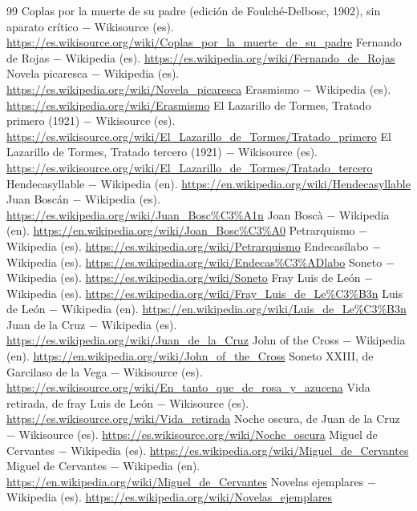 \documentclass{book}
\begin{document}
\begin{thebibliography}{99}
 Coplas por la muerte de su padre (edición de Foulché-Delbosc, 1902), sin aparato crítico \(-\) Wikisource (es). \url{https://es.wikisource.org/wiki/Coplas_por_la_muerte_de_su_padre}
 Fernando de Rojas \(-\) Wikipedia (es). \url{https://es.wikipedia.org/wiki/Fernando_de_Rojas}
 Novela picaresca \(-\) Wikipedia (es). \url{https://es.wikipedia.org/wiki/Novela_picaresca}
 Erasmismo \(-\) Wikipedia (es). \url{https://es.wikipedia.org/wiki/Erasmismo}
 El Lazarillo de Tormes, Tratado primero (1921) \(-\) Wikisource (es). \url{https://es.wikisource.org/wiki/El_Lazarillo_de_Tormes/Tratado_primero}
 El Lazarillo de Tormes, Tratado tercero (1921) \(-\) Wikisource (es). \url{https://es.wikisource.org/wiki/El_Lazarillo_de_Tormes/Tratado_tercero}
 Hendecasyllable \(-\) Wikipedia (en). \url{https://en.wikipedia.org/wiki/Hendecasyllable}
 Juan Boscán \(-\) Wikipedia (es). \url{https://es.wikipedia.org/wiki/Juan_Bosc%C3%A1n}
 Joan Boscà \(-\) Wikipedia (en). \url{https://en.wikipedia.org/wiki/Joan_Bosc%C3%A0}
 Petrarquismo \(-\) Wikipedia (es). \url{https://es.wikipedia.org/wiki/Petrarquismo}
 Endecasílabo \(-\) Wikipedia (es). \url{https://es.wikipedia.org/wiki/Endecas%C3%ADlabo}
 Soneto \(-\) Wikipedia (es). \url{https://es.wikipedia.org/wiki/Soneto}
 Fray Luis de León \(-\) Wikipedia (es). \url{https://es.wikipedia.org/wiki/Fray_Luis_de_Le%C3%B3n}
 Luis de León \(-\) Wikipedia (en). \url{https://en.wikipedia.org/wiki/Luis_de_Le%C3%B3n}
 Juan de la Cruz \(-\) Wikipedia (es). \url{https://es.wikipedia.org/wiki/Juan_de_la_Cruz}
 John of the Cross \(-\) Wikipedia (en). \url{https://en.wikipedia.org/wiki/John_of_the_Cross}
 Soneto XXIII, de Garcilaso de la Vega \(-\) Wikisource (es). \url{https://es.wikisource.org/wiki/En_tanto_que_de_rosa_y_azucena}
 Vida retirada, de fray Luis de León \(-\) Wikisource (es). \url{https://es.wikisource.org/wiki/Vida_retirada}
 Noche oscura, de Juan de la Cruz \(-\) Wikisource (es). \url{https://es.wikisource.org/wiki/Noche_oscura}
 Miguel de Cervantes \(-\) Wikipedia (es). \url{https://es.wikipedia.org/wiki/Miguel_de_Cervantes}
 Miguel de Cervantes \(-\) Wikipedia (en). \url{https://en.wikipedia.org/wiki/Miguel_de_Cervantes}
 Novelas ejemplares \(-\) Wikipedia (es). \url{https://es.wikipedia.org/wiki/Novelas_ejemplares}

\end{thebibliography}
\end{document}
